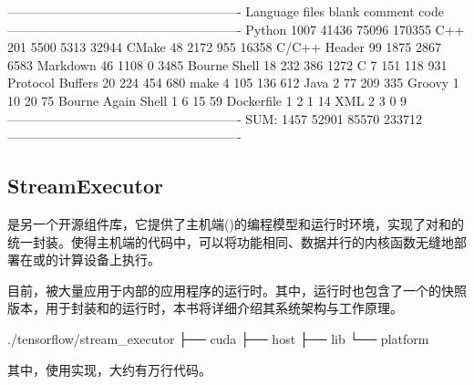 \begin{content}
\begin{leftbar}
\begin{python}[caption={Contrib代码统计}]
-------------------------------------------------------
Language            files     blank   comment      code
-------------------------------------------------------
Python               1007     41436     75096    170355
C++                   201      5500      5313     32944
CMake                  48      2172       955     16358
C/C++ Header           99      1875      2867      6583
Markdown               46      1108         0      3485
Bourne Shell           18       232       386      1272
C                       7       151       118       931
Protocol Buffers       20       224       454       680
make                    4       105       136       612
Java                    2        77       209       335
Groovy                  1        10        20        75
Bourne Again Shell      1         6        15        59
Dockerfile              1         2         1        14
XML                     2         3         0         9
-------------------------------------------------------
SUM:                 1457     52901     85570    233712
-------------------------------------------------------
\end{python}
\end{leftbar}

\subsection{StreamExecutor}

是另一个开源组件库，它提供了主机端()的编程模型和运行时环境，实现了对和的统一封装。使得主机端的代码中，可以将功能相同、数据并行的内核函数无缝地部署在或的计算设备上执行。

目前，被大量应用于内部的应用程序的运行时。其中，\tf{}运行时也包含了一个的快照版本，用于封装和的运行时，本书将详细介绍其系统架构与工作原理。

\begin{leftbar}
\begin{c++}[caption={StreamExecutor源码结构}]
./tensorflow/stream_executor
├── cuda
├── host
├── lib
└── platform
\end{c++}
\end{leftbar}

其中，使用实现，大约有万行代码。


\end{content}
